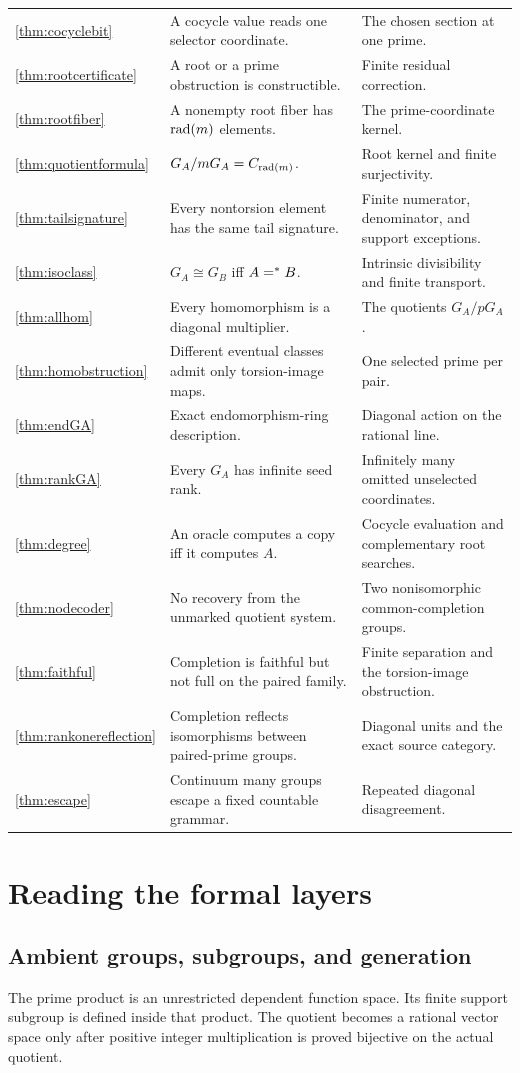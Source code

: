 \begin{longtable}{@{}>{\raggedright\arraybackslash}p{}>{\raggedright\arraybackslash}p{}>{\raggedright\arraybackslash}p{}@{}}
\ref{thm:cocyclebit}&A cocycle value reads one selector coordinate.&The chosen section at one prime.\\
\ref{thm:rootcertificate}&A root or a prime obstruction is constructible.&Finite residual correction.\\
\ref{thm:rootfiber}&A nonempty root fiber has $\operatorname{rad}(m)$ elements.&The prime-coordinate kernel.\\
\ref{thm:quotientformula}&$G_A/mG_A=C_{\operatorname{rad}(m)}$.&Root kernel and finite surjectivity.\\
\ref{thm:tailsignature}&Every nontorsion element has the same tail signature.&Finite numerator, denominator, and support exceptions.\\
\ref{thm:isoclass}&$G_A\cong G_B$ iff $A=^{*} B$.&Intrinsic divisibility and finite transport.\\
\ref{thm:allhom}&Every homomorphism is a diagonal multiplier.&The quotients $G_A/pG_A$.\\
\ref{thm:homobstruction}&Different eventual classes admit only torsion-image maps.&One selected prime per pair.\\
\ref{thm:endGA}&Exact endomorphism-ring description.&Diagonal action on the rational line.\\
\ref{thm:rankGA}&Every $G_A$ has infinite seed rank.&Infinitely many omitted unselected coordinates.\\
\ref{thm:degree}&An oracle computes a copy iff it computes $A$.&Cocycle evaluation and complementary root searches.\\
\ref{thm:nodecoder}&No recovery from the unmarked quotient system.&Two nonisomorphic common-completion groups.\\
\ref{thm:faithful}&Completion is faithful but not full on the paired family.&Finite separation and the torsion-image obstruction.\\
\ref{thm:rankonereflection}&Completion reflects isomorphisms between paired-prime groups.&Diagonal units and the exact source category.\\
\ref{thm:escape}&Continuum many groups escape a fixed countable grammar.&Repeated diagonal disagreement.\\
\bottomrule
\end{longtable}
\normalsize


\section{Reading the formal layers}
\subsection{Ambient groups, subgroups, and generation}
The prime product is an unrestricted dependent function space. Its finite support subgroup is defined inside that product. The quotient becomes a rational vector space only after positive integer multiplication is proved bijective on the actual quotient.

